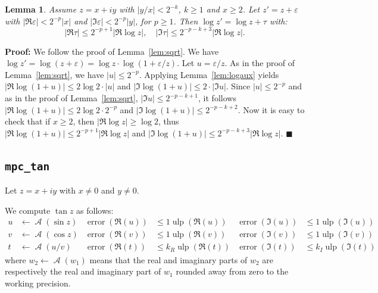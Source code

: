 \documentclass [11pt]{article}
\newcommand {\Ulp}{{\operatorname {ulp}}}
\newcommand{\error}{\operatorname {error}}
\DeclareMathOperator{\A}{\mathcal A}
\renewcommand {\epsilon}{\varepsilon}
\renewcommand {\leq}{\leqslant}
\newtheorem{lemma}[theorem]{Lemma}
\newenvironment{proof}{\noindent \textbf {Proof:}}{{\hspace* {\fill}$\blacksquare$}}
\begin{document}
\begin{lemma} \label{lem:log}
  Assume $z = x + iy$ with $|y/x| < 2^{-k}$, $k \ge 1$ and $x \ge 2$.
  Let $z' = z + \epsilon$ with $|\Re\epsilon| < 2^{-p} |x|$
  and $|\Im\epsilon| < 2^{-p} |y|$, for $p \ge 1$.
  Then $\log z' = \log z + \tau$ with:
  \[ |\Re\tau| \le 2^{-p+1} |\Re\log z|, \quad
     |\Im\tau| \le 2^{-p-k+3} |\Re\log z|. \]
\end{lemma}
\begin{proof}
  We follow the proof of Lemma~\ref{lem:sqrt}.
  We have $\log z' = \log(z + \epsilon) = \log z \cdot \log(1+\epsilon/z)$.
  Let $u = \epsilon/z$. As in the proof of Lemma~\ref{lem:sqrt},
  we have $|u| \le 2^{-p}$.
  Applying Lemma~\ref{lem:logaux} yields
  $|\Re \log(1+u)| \le 2 \log 2 \cdot |u|$ and
  $|\Im \log(1+u)| \le 2 \cdot |\Im u|$.
  Since $|u| \le 2^{-p}$ and
  as in the proof of Lemma~\ref{lem:sqrt},
  $|\Im u| \le 2^{-p-k+1}$, it follows
  $|\Re \log(1+u)| \le 2 \log 2 \cdot 2^{-p}$ and
  $|\Im \log(1+u)| \le 2^{-p-k+2}$.
  Now it is easy to check that if $x \ge 2$, then
  $|\Re\log z| \ge \log 2$, thus
  $|\Re \log(1+u)| \le 2^{-p+1} |\Re\log z|$ and
  $|\Im \log(1+u)| \le 2^{-p-k+3} |\Re\log z|$.
\end{proof}

\subsection {\texttt {mpc\_tan}}

Let $z = x + i y$ with $x \neq 0$ and $y \neq 0$.

We compute $\tan z$ as follows:
\begin{align*}
u &\leftarrow \A(\sin z) &\error(\Re(u)) &\leq 1 \Ulp(\Re(u))
&\error(\Im(u)) &\leq 1 \Ulp(\Im(u))
\\
v &\leftarrow \A(\cos z) &\error(\Re(v)) &\leq 1 \Ulp(\Re(v))
&\error(\Im(v)) &\leq 1 \Ulp(\Im(v))
\\
t &\leftarrow \A(u/v) &\error(\Re(t)) &\leq k_R \Ulp(\Re(t))
&\error(\Im(t)) &\leq k_I \Ulp(\Im(t))
\end{align*}
where $w_2 \leftarrow \A(w_1)$ means that the real and imaginary parts of
$w_2$ are respectively the real and imaginary part of $w_1$ rounded away from
zero to the working precision.
\end{document}
